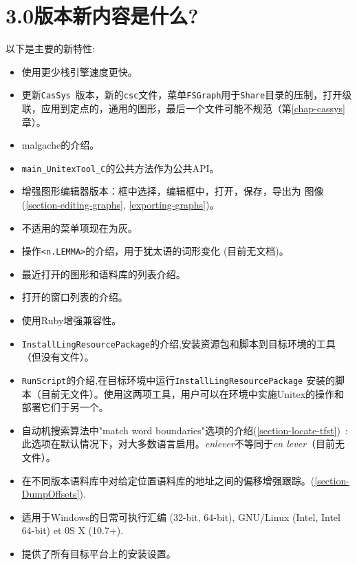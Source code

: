 \section*{3.0版本新内容是什么?}
以下是主要的新特性:
\begin{itemize}

  \item 使用更少栈引擎速度更快。
  \item 更新\verb$CasSys$~版本，新的\verb$csc$文件，菜单\verb$FSGraph$用于\verb$Share$目录的压制，打开级联，应用到定点的，通用的图形，最后一个文件可能不规范（第\ref{chap-cassys}章）。
   \item malgache的介绍。
  \item \verb$main_UnitexTool_C$的公共方法作为公共API。
  
  \item 增强图形编辑器版本：框中选择，编辑框中，打开，保存，导出为
图像(\ref{section-editing-graphs}, \ref{exporting-graphs})。
  
  \item 不适用的菜单项现在为灰。
  \item 操作\verb$<n.LEMMA>$的介绍，用于犹太语的词形变化 (目前无文档)。
  \item 最近打开的图形和语料库的列表介绍。
  \item 打开的窗口列表的介绍。
  \item 使用Ruby增强兼容性。
  \item \verb$InstallLingResourcePackage$的介绍,安装资源包和脚本到目标环境的工具（但没有文件）。 
  \item  \verb$RunScript$的介绍,在目标环境中运行\verb$InstallLingResourcePackage$ 安装的脚本（目前无文件）。使用这两项工具，用户可以在环境中实施Unitex的操作和部署它们于另一个。
  \item  自动机搜索算法中"match word boundaries"选项的介绍(\ref{section-locate-tfst})~: 此选项在默认情况下，对大多数语言启用。\textit{enlever}不等同于\textit{en lever}（目前无文件）。
  \item 在不同版本语料库中对给定位置语料库的地址之间的偏移增强跟踪。(\ref{section-DumpOffsets}).
  
  \item 适用于Windows的日常可执行汇编 (32-bit, 64-bit), GNU/Linux (Intel, Intel 64-bit) et 0S X (10.7+).
  \item 提供了所有目标平台上的安装设置。

\end{itemize}

